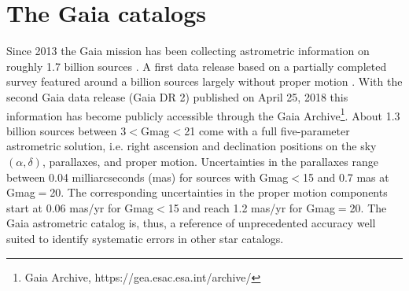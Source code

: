 \documentclass[review]{elsarticle}
\begin{document}
\section{The Gaia catalogs} 
\label{sec:gaiadr2}
Since 2013 the Gaia mission has been collecting astrometric information on roughly 1.7 billion sources \citep{gaiadr2}. A first data release based on a partially completed survey featured around a billion sources largely without proper motion \citep{gaiadr1}.
With the second Gaia data release (Gaia DR 2) published on April 25, 2018 this information has become publicly accessible through the Gaia Archive\footnote{Gaia Archive, https://gea.esac.esa.int/archive/}. 
About 1.3 billion sources between 3$<$Gmag$<$21 come with a full five-parameter astrometric solution, i.e. right ascension and declination positions on the sky $(\alpha,\delta)$, parallaxes, and proper motion. Uncertainties in the parallaxes range between 0.04 milliarcseconds (mas) for sources with Gmag$<$15 and 0.7 mas at Gmag$=$20. The corresponding uncertainties in the proper motion components start at 0.06 mas/yr for Gmag$<$15 and reach 1.2 mas/yr for Gmag$=$20. The Gaia astrometric catalog is, thus, a reference of unprecedented accuracy well suited to identify systematic errors in other star catalogs.
\end{document}
